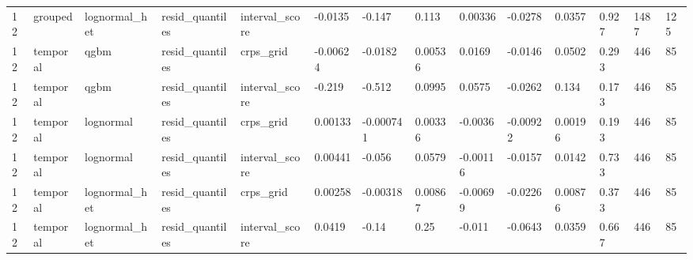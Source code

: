 \begin{tabular}{llllllllllllll}
12 & grouped & lognormal\_het & resid\_quantiles & interval\_score & -0.0135 & -0.147 & 0.113 & 0.00336 & -0.0278 & 0.0357 & 0.927 & 1487 & 125 \\
12 & temporal & qgbm & resid\_quantiles & crps\_grid & -0.00624 & -0.0182 & 0.00536 & 0.0169 & -0.0146 & 0.0502 & 0.293 & 446 & 85 \\
12 & temporal & qgbm & resid\_quantiles & interval\_score & -0.219 & -0.512 & 0.0995 & 0.0575 & -0.0262 & 0.134 & 0.173 & 446 & 85 \\
12 & temporal & lognormal & resid\_quantiles & crps\_grid & 0.00133 & -0.000741 & 0.00336 & -0.0036 & -0.00922 & 0.00196 & 0.193 & 446 & 85 \\
12 & temporal & lognormal & resid\_quantiles & interval\_score & 0.00441 & -0.056 & 0.0579 & -0.00116 & -0.0157 & 0.0142 & 0.733 & 446 & 85 \\
12 & temporal & lognormal\_het & resid\_quantiles & crps\_grid & 0.00258 & -0.00318 & 0.00867 & -0.00699 & -0.0226 & 0.00876 & 0.373 & 446 & 85 \\
12 & temporal & lognormal\_het & resid\_quantiles & interval\_score & 0.0419 & -0.14 & 0.25 & -0.011 & -0.0643 & 0.0359 & 0.667 & 446 & 85 \\
\bottomrule
\end{tabular}